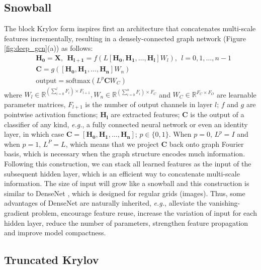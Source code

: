 \documentclass{article}
\newcommand\eg{\textit{e.g.}}
\begin{document}
\subsection{Snowball}
\label{snowball_gcn}

The block Krylov form inspires first an architecture that concatenates multi-scale features incrementally, resulting in a densely-connected graph network (Figure \ref{fig:deep_gcn}(a)) as follows:
\begin{align}
\label{snowball}
&\bm{H_0} = \bm{X},\ \ \bm{H_{l+1}} = f \left( L \left[ \bm{H_0}, \bm{H_1},\dots, \bm{H_l} \right] W_l \right),\ \ l=0,1, \dots,n - 1 \nonumber \\
& \bm{C} = g \left( \left[ \bm{H_0}, \bm{H_1},\dots, \bm{H_n} \right] W_n \right)\\
& \mbox{output} = \text{softmax} \left( L^{p} \bm{C} W_C \right) \nonumber
\end{align}
where $W_l \in \mathbb{R}^{\left( \sum_{i=0}^l F_i \right)  \times F_{l+1} }, W_n \in \mathbb{R}^{\left( \sum_{i=0}^n F_i \right)  \times F_C}$ and $W_C \in \mathbb{R}^{F_C \times F_O}$ are learnable parameter matrices, $F_{l+1}$ is the number of output channels in layer $l$; $f$ and $g$ are pointwise activation functions; $\bm{H_l}$ are extracted features; $\bm{C}$ is the output of a classifier of any kind, \eg{}, a fully connected neural network or even an identity layer, in which case $\bm{C}=[\bm{H_0}, \bm{H_1},\dots, \bm{H_n}]$; $p \in \{0,1\}$. When $p=0$, $L^p=I$ and when $p=1$, $L^P=L$, which means that we project $\bm{C}$ back onto graph Fourier basis, which is necessary when the graph structure encodes much information. Following this construction, we can stack all learned features as the input of the subsequent hidden layer, which is an efficient way to concatenate multi-scale information. The size of input will grow like a snowball and this construction is similar to DenseNet \cite{huang2017densely}, which is designed for regular grids (images). Thus, some advantages of DenseNet are naturally inherited, \eg{}, alleviate the vanishing-gradient problem, encourage feature reuse, increase the variation of input for each hidden layer, reduce the number of parameters, strengthen feature propagation and improve model compactness.

\subsection{Truncated Krylov}
\end{document}
